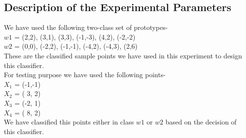 \subsection{Description of the Experimental Parameters}
We have used the following two-class set of prototypes-\\
$w1$ = {(2,2), (3,1), (3,3), (-1,-3), (4,2), (-2,-2)}\\
$w2$ = {(0,0), (-2,2), (-1,-1), (-4,2), (-4,3), (2,6)}\\
These are the classified sample points we have used in this experiment to design this classifier.\\
For testing purpose we have used the following points-\\
$X_{1}$ = (-1,-1)\\
$X_{2}$ = ( 3, 2)\\
$X_{3}$ = (-2, 1)\\
$X_{4}$ = ( 8, 2)\\
We have classified this points either in class $w1$ or $w2$ based on the decision of this classifier.

